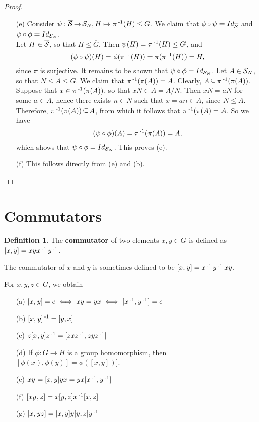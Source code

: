 \documentclass[11pt]{book}
\theoremstyle{definition}   \newtheorem{defn}[counter]{Definition} %
\newcommand{\ov}{\overline}   \newcommand{\wt}{\widetilde}
\DeclareMathOperator{\ra}{\rightarrow}   \DeclareMathOperator{\Poly}{\mathbf{P}}   \DeclareMathOperator{\spn}{\textnormal{span}}   \DeclareMathOperator{\aut}{\textnormal{Aut}}
\newcommand{\vs}{\vspace{8pt}}
\numberwithin{counter}{chapter}
\begin{document}
\begin{proof}
\begin{enumerate}
\item[(e)] Consider $\psi : \ov{\mc{S}} \ra \mc{S}_N, H \mapsto \pi\inv(H) \leq G$. We claim that $\phi \circ \psi = Id_{\ov{\mc{S}}}$ and $\psi \circ \phi = Id_{\mathcal{S}_N}$. \\
Let $H \in \ov{\mc{S}}$, so that $H \leq \ov{G}$. Then $\psi(H) = \pi\operatorname{^{-1}} (H) \leq G$, and
	\[ (\phi\circ \psi)(H) = \phi(\pi \operatorname{^{-1}}(H)) = \pi(\pi\operatorname{^{-1}}(H)) = H, \]
since $\pi$ is surjective. It remains to be shown that $\psi \circ \phi = Id_{\mathcal{S}_N}$. Let $A \in \mathcal{S}_N$, so that $N \leq A \leq G$. We claim that $\pi\operatorname{^{-1}}(\pi(A)) = A$. Clearly, $A \operatorname{\subseteq} \pi\operatorname{^{-1}}(\pi(A))$. Suppose that $x \in \pi\operatorname{^{-1}}(\pi(A))$, so that $xN \in \ov{A} = A/N$. Then $xN = aN$ for some $a \in A$, hence there exists $n \in N$ such that $x = an \in A$, since $N \leq A$. Therefore, $\pi\operatorname{^{-1}}(\pi(A)) \operatorname{\subseteq} A$, from which it follows that $\pi\operatorname{^{-1}}(\pi(A) = A$. So we have
	\[(\psi\circ \phi)(A) = \pi\operatorname{^{-1}}(\pi(A)) = A, \]
which shows that $\psi \circ \phi = Id_{\mathcal{S}_N}$. This proves (e). \\

\item[(f)] This follows directly from (e) and (b).
\end{enumerate}
\end{proof}


\section*{Commutators}

\vs

\begin{defn}
The \textbf{commutator} of two elements $x,y \in G$ is defined as $[x,y] = xyx\operatorname{^{-1}} y\operatorname{^{-1}}$.
\end{defn}

\vs

\begin{warning}
The commutator of $x$ and $y$ is sometimes defined to be $[x,y] = x\operatorname{^{-1}} y\operatorname{^{-1}} xy$.
\end{warning}

\vs

\begin{lemma}
For $x,y,z \in G$, we obtain
	\begin{enumerate}
	\item[(a)] $[x,y] = e \iff xy = yx \iff [x\operatorname{^{-1}},y\operatorname{^{-1}}] = e$
	\item[(b)] $[x,y]\operatorname{^{-1}} = [y,x]$
	\item[(c)] $z[x,y]z\operatorname{^{-1}} = [zxz\operatorname{^{-1}},zyz\operatorname{^{-1}}]$
	\item[(d)] If $\phi : G \ra H$ is a group homomorphism, then $[\phi(x),\phi(y)] = \phi([x,y])]$.
	\item[(e)] $xy = [x,y]yx = yx[x\operatorname{^{-1}},y\operatorname{^{-1}}]$
	\item[(f)] $[xy,z] = x[y,z]x\operatorname{^{-1}} [x,z]$
	\item[(g)] $[x,yz] = [x,y]y[y,z]y\operatorname{^{-1}}$
	\end{enumerate}
\end{lemma}
\end{document}
